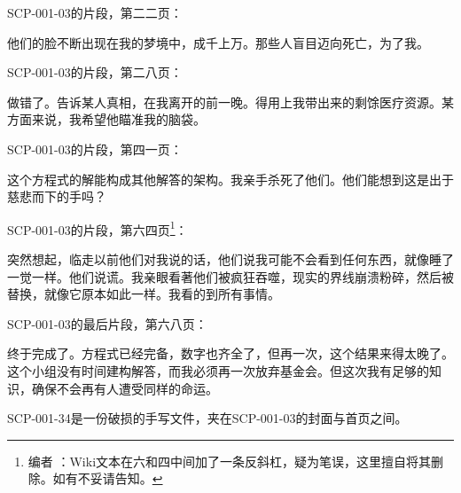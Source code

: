 SCP-001-03的片段，第二二页：

\begin{scpbox}
他们的脸不断出现在我的梦境中，成千上万。那些人盲目迈向死亡，为了我。
\end{scpbox}

SCP-001-03的片段，第二八页：

\begin{scpbox}
做错了。告诉某人真相，在我离开的前一晚。得用上我带出来的剩馀医疗资源。某方面来说，我希望他瞄准我的脑袋。
\end{scpbox}

SCP-001-03的片段，第四一页：

\begin{scpbox}
这个方程式的解能构成其他解答的架构。我亲手杀死了他们。他们能想到这是出于慈悲而下的手吗？
\end{scpbox}

SCP-001-03的片段，第六四页\footnote{编者 \QIS ：Wiki文本在六和四中间加了一条反斜杠，疑为笔误，这里擅自将其删除。如有不妥请告知。}：

\begin{scpbox}
突然想起，临走以前他们对我说的话，他们说我可能不会看到任何东西，就像睡了一觉一样。他们说谎。我亲眼看著他们被疯狂吞噬，现实的界线崩溃粉碎，然后被替换，就像它原本如此一样。我看的到所有事情。
\end{scpbox}

SCP-001-03的最后片段，第六八页：

\begin{scpbox}
终于完成了。方程式已经完备，数字也齐全了，但再一次，这个结果来得太晚了。这个小组没有时间建构解答，而我必须再一次放弃基金会。但这次我有足够的知识，确保不会再有人遭受同样的命运。
\end{scpbox}

SCP-001-34是一份破损的手写文件，夹在SCP-001-03的封面与首页之间。

